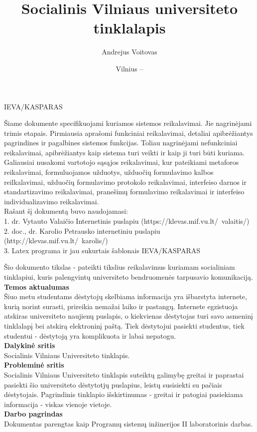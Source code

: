 \documentclass{VUMIFPSkursinis}
\title{Socialinis Vilniaus universiteto tinklalapis}
\author{Andrejus Voitovas}
\date{Vilnius – \the\year}
\begin{document}
\maketitle
\cleardoublepage{}
\setcounter{page}{2}
IEVA/KASPARAS

Šiame dokumente specifikuojami kuriamos sistemos reikalavimai. Jie nagrinėjami trimis etapais. Pirmiausia aprašomi funkciniai reikalavimai, detaliai apibrėžiantys pagrindines ir pagalbines sistemos funkcijas. Toliau nagrinėjami nefunkciniai reikalavimai, apibrėžiantys kaip sistema turi veikti ir kaip ji turi būti kuriama. Galiausiai nusakomi vartotojo sąsąjos reikalavimai, kur pateikiami metaforos reikalavimai, formuluojamos užduotys, užduočių formulavimo kalbos reilkalavimai, užduočių formulavimo protokolo reikalavimai, interfeiso darnos ir standartizavimo reikalavimai, pranešimų formulavimo reikalavimai ir interfeiso individualizavimo reikalavimai.
\\Rašant šį dokumentą buvo naudojamasi:
\\1. dr. Vytauto Valaičio Internetinis puslapiu (https://klevas.mif.vu.lt/~valaitis/)
\\2. doc., dr. Karolio Petrausko internetiniu puslapiu (http://klevas.mif.vu.lt/~karolis/)
\\3. Latex programa ir jau sukurtais šablonais
\newpage
\tableofcontents
{}
IEVA/KASPARAS

Šio dokumento tikslas - pateikti tikslius reikalavimus kuriamam socialiniam tinklapiui, kuris palengvintų universiteto bendruomenės tarpusavio komunikaciją.
\\\textbf{Temos aktualumas}
\\Šiuo metu studentams dėstytojų skelbiama informacija yra išbarstyta internete, kurią norint surasti, prireikia nemažai laiko ir pastangų. Internete egzistuoja atskiras universiteto naujienų puslapis, o kiekvienas dėstytojas turi savo asmeninį tinklalapį bei atskirą elektroninį paštą. Tiek dėstytojui pasiekti studentus, tiek studentui - dėstytoją yra komplikuota ir labai nepatogu.
\\\textbf{Dalykinė sritis}
\\Socialinis Vilniaus Universiteto tinklapis.
\\\textbf{Probleminė sritis} 
\\Socialinis Vilniaus Universiteto tinklapis suteiktų galimybę greitai ir paprastai pasiekti šio universiteto dėstytotjų puslapius, leistų susisiekti su pačiais dėstytojais. Pagrindinis tinklapio išskirtinumas - greitai ir patogiai pasiekiama informacija - viskas vienoje vietoje.
\\\textbf{Darbo pagrindas}
\\Dokumentas parengtas kaip Programų sistemų inžinerijos II laboratorinis darbas.
\end{document}
